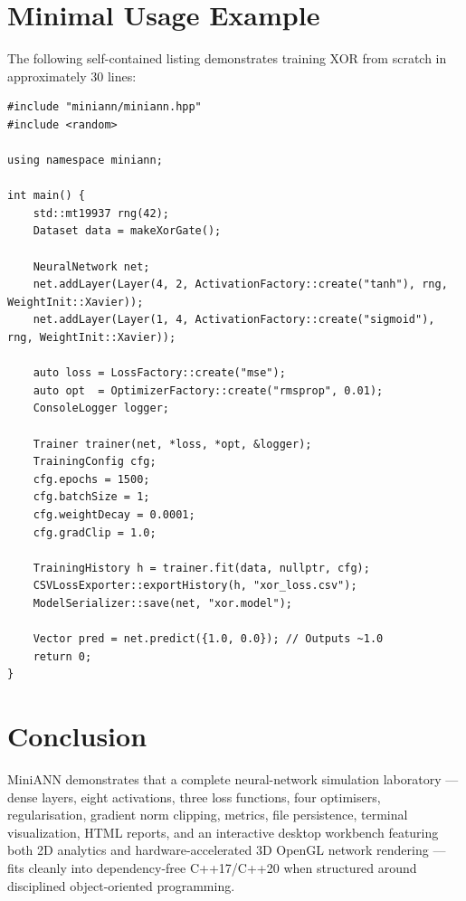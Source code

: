 \documentclass[11pt,a4paper]{article}
\begin{document}
\section{Minimal Usage Example}

The following self-contained listing demonstrates training XOR from scratch in approximately 30 lines:

\begin{lstlisting}
#include "miniann/miniann.hpp"
#include <random>

using namespace miniann;

int main() {
    std::mt19937 rng(42);
    Dataset data = makeXorGate();

    NeuralNetwork net;
    net.addLayer(Layer(4, 2, ActivationFactory::create("tanh"), rng, WeightInit::Xavier));
    net.addLayer(Layer(1, 4, ActivationFactory::create("sigmoid"), rng, WeightInit::Xavier));

    auto loss = LossFactory::create("mse");
    auto opt  = OptimizerFactory::create("rmsprop", 0.01);
    ConsoleLogger logger;

    Trainer trainer(net, *loss, *opt, &logger);
    TrainingConfig cfg;
    cfg.epochs = 1500;
    cfg.batchSize = 1;
    cfg.weightDecay = 0.0001;
    cfg.gradClip = 1.0;

    TrainingHistory h = trainer.fit(data, nullptr, cfg);
    CSVLossExporter::exportHistory(h, "xor_loss.csv");
    ModelSerializer::save(net, "xor.model");

    Vector pred = net.predict({1.0, 0.0}); // Outputs ~1.0
    return 0;
}
\end{lstlisting}

\section{Conclusion}

MiniANN demonstrates that a complete neural-network simulation laboratory --- dense layers, eight activations, three loss functions, four optimisers, regularisation, gradient norm clipping, metrics, file persistence, terminal visualization, HTML reports, and an interactive desktop workbench featuring both 2D analytics and hardware-accelerated 3D OpenGL network rendering --- fits cleanly into dependency-free C++17/C++20 when structured around disciplined object-oriented programming.
\end{document}
